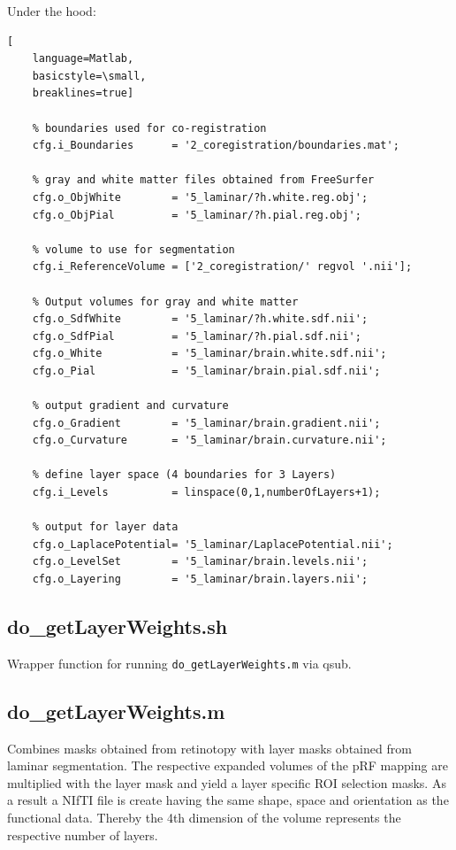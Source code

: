 \documentclass[12pt,a4paper]{scrartcl}
\begin{document}
\noindent Under the hood:
\begin{lstlisting}[
    language=Matlab,
    basicstyle=\small,
    breaklines=true]

    % boundaries used for co-registration
    cfg.i_Boundaries      = '2_coregistration/boundaries.mat';

    % gray and white matter files obtained from FreeSurfer
    cfg.o_ObjWhite        = '5_laminar/?h.white.reg.obj';
    cfg.o_ObjPial         = '5_laminar/?h.pial.reg.obj';

    % volume to use for segmentation
    cfg.i_ReferenceVolume = ['2_coregistration/' regvol '.nii'];

    % Output volumes for gray and white matter
    cfg.o_SdfWhite        = '5_laminar/?h.white.sdf.nii';
    cfg.o_SdfPial         = '5_laminar/?h.pial.sdf.nii';
    cfg.o_White           = '5_laminar/brain.white.sdf.nii';
    cfg.o_Pial            = '5_laminar/brain.pial.sdf.nii';

    % output gradient and curvature
    cfg.o_Gradient        = '5_laminar/brain.gradient.nii';
    cfg.o_Curvature       = '5_laminar/brain.curvature.nii';

    % define layer space (4 boundaries for 3 Layers)
    cfg.i_Levels          = linspace(0,1,numberOfLayers+1);

    % output for layer data
    cfg.o_LaplacePotential= '5_laminar/LaplacePotential.nii';
    cfg.o_LevelSet        = '5_laminar/brain.levels.nii';
    cfg.o_Layering        = '5_laminar/brain.layers.nii';
\end{lstlisting}

\subsection{do\_getLayerWeights.sh}
\label{sec:getLyrW}
Wrapper function for running \texttt{do\_getLayerWeights.m} via qsub.

\subsection{do\_getLayerWeights.m}
Combines masks obtained from retinotopy with layer masks obtained from laminar segmentation. The respective expanded volumes of the pRF mapping are multiplied with the layer mask and yield a layer specific ROI selection masks. As a result a NIfTI file is create having the same shape, space and orientation as the functional data. Thereby the 4th dimension of the volume represents the respective number of layers.
\end{document}
